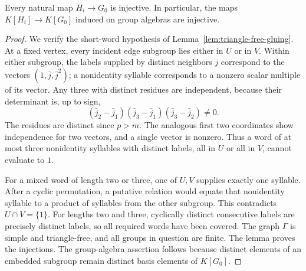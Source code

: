 \begin{proposition}\label{prop:first-gluing-injective}
Every natural map $H_i\to G_0$ is injective.  In particular, the maps
$K[H_i]\to K[G_0]$ induced on group algebras are injective.
\end{proposition}

\begin{proof}
We verify the short-word hypothesis of
Lemma~\ref{lem:triangle-free-gluing}.  At a fixed vertex, every incident
edge subgroup lies either in $U$ or in $V$.  Within either subgroup,
the labels supplied by distinct neighbors $j$ correspond to the
vectors $(1,\bar j,\bar j^{2})$; a nonidentity syllable corresponds
to a nonzero scalar multiple of its vector.  Any three with distinct residues
are independent, because their determinant is, up to sign,
\[
 (\bar j_2-\bar j_1)(\bar j_3-\bar j_1)
 (\bar j_3-\bar j_2)\neq0.
\]
The residues are distinct since $p>m$.  The analogous first two
coordinates show independence for two vectors, and a single vector
is nonzero.  Thus a word of at most three nonidentity syllables with
distinct labels, all in $U$ or all in $V$, cannot evaluate to $1$.

For a mixed word of length two or three, one of $U,V$ supplies exactly
one syllable.  After a cyclic permutation, a putative relation would
equate that nonidentity syllable to a product of syllables from the
other subgroup. This contradicts $U\cap V=\{1\}$. For lengths
two and three, cyclically distinct consecutive labels are precisely
distinct labels, so all required words have been covered.  The graph
$\Gamma$ is simple and triangle-free, and all groups in question are
finite.  The lemma proves the injections.  The group-algebra assertion
follows because distinct elements of an embedded subgroup remain
distinct basis elements of $K[G_0]$.
\end{proof}
